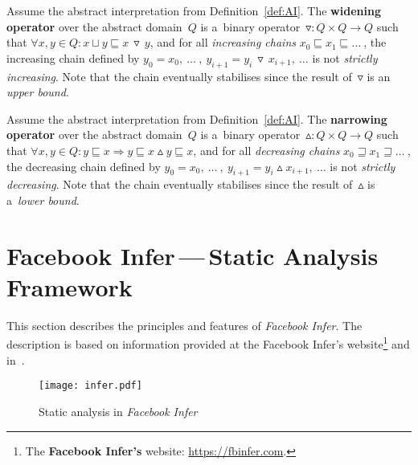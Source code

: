 \begin{definition}
    Assume the abstract interpretation from Definition~\ref{def:AI}. The \textbf{widening operator} over the abstract domain~$ Q $ is a~binary operator~$ \triangledown : Q \times Q \rightarrow Q $ such that $ \forall x, y \in Q : x \sqcup y \sqsubseteq x\,\triangledown\,y $, and for all \emph{increasing chains} $ x_0 \sqsubseteq x_1 \sqsubseteq \ldots\ $, the increasing chain defined by $ y_0 = x_0,\ \ldots\ ,\ y_{i + 1} = y_i\,\triangledown\,x_{i + 1},\ \ldots $ is not \emph{strictly increasing}. Note that the chain eventually stabilises since the result of~$ \triangledown $ is an \emph{upper bound}.
\end{definition}

\begin{definition}
    Assume the abstract interpretation from Definition~\ref{def:AI}. The \textbf{narrowing operator} over the abstract domain~$ Q $ is a~binary operator~$ \vartriangle : Q \times Q \rightarrow Q $ such that $ \forall x, y \in Q : y \sqsubseteq x \Longrightarrow y \sqsubseteq x \vartriangle y \sqsubseteq x $, and for all \emph{decreasing chains} $ x_0 \sqsupseteq x_1 \sqsupseteq \ldots\ $, the decreasing chain defined by $ y_0 = x_0,\ \ldots\ ,\ y_{i + 1} = y_i \vartriangle x_{i + 1},\ \ldots $ is not \emph{strictly decreasing}. Note that the chain eventually stabilises since the result of~$ \vartriangle $ is a~\emph{lower bound}.
\end{definition}


\section{\texorpdfstring{Facebook Infer\,---\,Static Analysis Framework}{Facebook Infer - Static Analysis Framework}}
\label{sec:fbinfer}

This section describes the principles and features of \emph{Facebook Infer}. The description is based on information provided at the Facebook Infer's website\footnote{The \textbf{Facebook Infer's} website: \url{https://fbinfer.com}.} and in~\cite{inferAISpeech}.

\begin{figure}[hbt]
    \centering
    \texttt{[image: infer.pdf]}
    \caption{Static analysis in \emph{Facebook Infer}}
    \label{fig:infer}
\end{figure}

